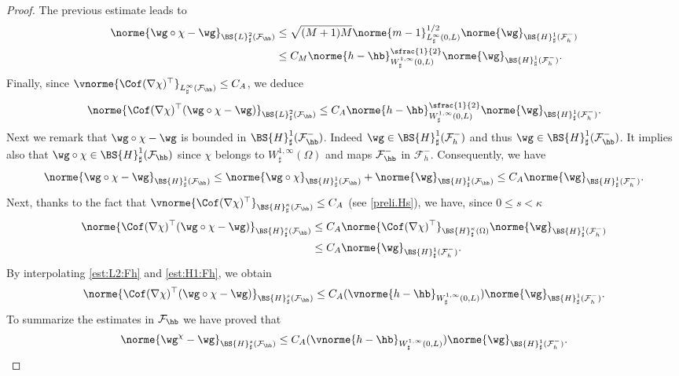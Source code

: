 \begin{proof}
The previous estimate leads to
\[
\begin{aligned}
\norme{\wg\circ\chi-\wg}_{\BS{L}^{2}_{\sharp}(\mathcal{F}_{\hb})}&{}\leq \sqrt{(M+1)M}\norme{m-1}_{L^{\infty}_{\sharp}(0,L)}^{1/2}\norme{\wg}_{\BS{H}^{1}_{\sharp}(\mathcal{F}_{h}^{-})}\nonumber\\
&\leq C_M\norme{h-\hb}_{W^{1,\infty}_{\sharp}(0,L)}^{\sfrac{1}{2}}\norme{\wg}_{\BS{H}^{1}_{\sharp}(\mathcal{F}_{h}^{-})}.
\end{aligned}
\]
Finally, since $\vnorme{\Cof(\nabla\chi)^{\top}}_{L^\infty_\sharp(\mathcal{F}_{\hb})}\leq C_A$, we deduce
\begin{equation}
\label{est:L2:Fh}
\norme{\Cof(\nabla\chi)^{\top}(\wg\circ\chi-\wg)}_{\BS{L}^{2}_{\sharp}(\mathcal{F}_{\hb})}\leq C_A\norme{h-\hb}_{W^{1,\infty}_{\sharp}(0,L)}^{\sfrac{1}{2}}\norme{\wg}_{\BS{H}^{1}_{\sharp}(\mathcal{F}_{h}^{-})}.
\end{equation}
Next we remark that $\wg\circ\chi - \wg$ is bounded in $\BS{H}_{\sharp}^1(\mathcal{F}^{-}_{\hb})$. Indeed $\wg\in \BS{H}_{\sharp}^1(\mathcal{F}^-_{h})$ and thus $\wg\in \BS{H}_{\sharp}^1(\mathcal{F}^{-}_{\hb})$. It implies also that $\wg\circ\chi \in \BS{H}_{\sharp}^1(\mathcal{F}_{\hb})$ since $\chi$ belongs to $W_{\sharp}^{1, \infty}(\Omega)$ and maps $\mathcal{F}^-_{\hb}$ in $\mathcal{F}^-_{h}$. Consequently, we have
\[
\norme{\wg\circ\chi - \wg}_{\BS{H}^{1}_{\sharp}(\mathcal{F}_{\hb})}\leq \norme{\wg\circ\chi}_{\BS{H}^{1}_{\sharp}(\mathcal{F}_{\hb})} + \norme{\wg}_{\BS{H}^{1}_{\sharp}(\mathcal{F}_{\hb})} \leq C_{A}\norme{\wg}_{\BS{H}^{1}_{\sharp}(\mathcal{F}^{-}_{h})}.
\]
Next, thanks to the fact that $\vnorme{\Cof(\nabla\chi)^{\top}}_{\BS{H}^\kappa_\sharp(\mathcal{F}_{\hb})}\leq C_A$ (see \eqref{preli.Hs}), we have, since $0\leq s<\kappa$
\begin{equation}
\begin{aligned}
\norme{\Cof(\nabla\chi)^{\top}(\wg\circ\chi - \wg)}_{\BS{H}^{s}_{\sharp}(\mathcal{F}_{\hb})}& \leq C_{A}{\norme{\Cof(\nabla\chi)^{\top}}_{\BS{H}^{\kappa}_{\sharp}(\Omega)}}\norme{\wg}_{\BS{H}^{1}_{\sharp}(\mathcal{F}^{-}_{h})} \\
& \leq C_{A}\norme{\wg}_{\BS{H}^{1}_{\sharp}(\mathcal{F}^{-}_{h})}.
\end{aligned}\label{est:H1:Fh}
\end{equation}
By interpolating \eqref{est:L2:Fh} and \eqref{est:H1:Fh}, we obtain
\[
\norme{\Cof(\nabla\chi)^{\top}(\wg\circ\chi - \wg)}_{\BS{H}^{s}_{\sharp}(\mathcal{F}_{\hb})}\leq C_A(\vnorme{h-\hb}_{W^{1,\infty}_{\sharp}(0,L)})\norme{\wg}_{\BS{H}^{1}_{\sharp}(\mathcal{F}^{-}_{h})}.
\]
To summarize the estimates in $\mathcal{F}_{\hb}$ we have proved that
\begin{equation} \label{eq.milieu}
\norme{\wg^\chi-\wg}_{\BS{H}^{s}_{\sharp}(\mathcal{F}_{\hb})}\leq C_A(\vnorme{h-\hb}_{W^{1,\infty}_{\sharp}(0,L)})\norme{\wg}_{\BS{H}^{1}_{\sharp}(\mathcal{F}^{-}_{h})}.
\end{equation}


\end{proof}
